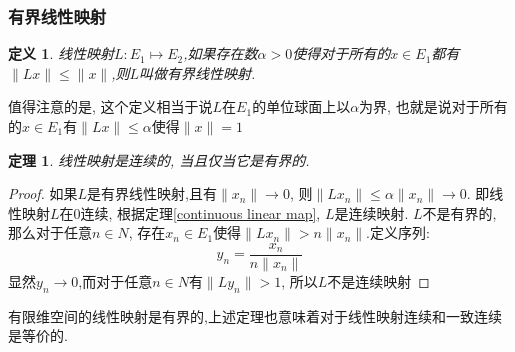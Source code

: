 \documentclass[a4paper,11pt]{article}
\newtheorem{definition}{\hspace{2em}定义}[section]
\newtheorem{theorem}{\hspace{2em}定理}[section]
\newtheorem{proof}{证明}[section]
\begin{document}
\subsubsection*{有界线性映射}
\begin{definition}
  线性映射$L:E_1\mapsto E_2$,如果存在数$\alpha>0$使得对于所有的$x\in E_1$都有$\|Lx\|\leq\|x\|$,则$L$叫做有界线性映射.
\end{definition}
值得注意的是, 这个定义相当于说$L$在$E_1$的单位球面上以$\alpha$为界, 也就是说对于所有的$x\in E_1$有$\|Lx\|\leq\alpha$使得$\|x\|=1$
\begin{theorem}
  线性映射是连续的, 当且仅当它是有界的.
\end{theorem}
\begin{proof}
  如果$L$是有界线性映射,且有$\|x_n\|\to 0$, 则$\|Lx_n\|\leq\alpha\|x_n\|\to 0$. 即线性映射$L$在$0$连续, 根据定理\ref{continuous linear map}, $L$是连续映射.
  $L$不是有界的, 那么对于任意$n\in N$, 存在$x_n\in E_1$使得$\|Lx_n\|>n\|x_n\|$.定义序列:
  \begin{equation*}
    y_n=\frac{x_n}{n\|x_n\|}
  \end{equation*}
  显然$y_n\to 0$,而对于任意$n\in N$有$\|Ly_n\|>1$, 所以$L$不是连续映射
\end{proof}
有限维空间的线性映射是有界的,上述定理也意味着对于线性映射连续和一致连续是等价的.
\end{document}
